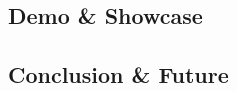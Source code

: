 \documentclass[12pt,a4paper,titlepage,listof=totoc,bibliography=totoc,chapteratlists=0pt]{scrreprt}
\begin{document}
\begin{spacing}{1}
\chapter{Demo \& Showcase}\label{chapter:demo}
\end{spacing}


\begin{spacing}{1}\lipsum[2-3]
\chapter{Conclusion \& Future}
\end{spacing}


\newpage
{}
\setcounter{page}{\value{RPages}}

\glsnogroupskiptrue
\printglossary[title=Glossar,toctitle=Glossar] %
\listoffigures
\listoftables
\lstlistoflistings
\appendix
{}

\end{document}
